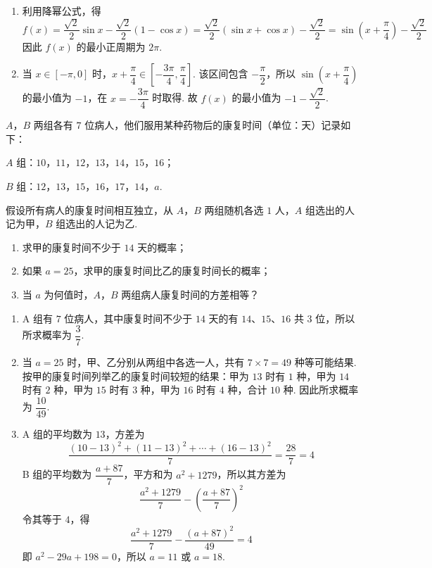 \begin{solution}
\begin{enumerate}
\item 利用降幂公式，得
\[
f(x)=\frac{\sqrt2}{2}\sin x-\frac{\sqrt2}{2}\left(1-\cos x\right)
=\frac{\sqrt2}{2}\left(\sin x+\cos x\right)-\frac{\sqrt2}{2}
=\sin\left(x+\frac{\pi}{4}\right)-\frac{\sqrt2}{2}
\]
因此 \(f(x)\) 的最小正周期为 \(2\pi\).
\item 当 \(x\in[-\pi,0]\) 时，\(x+\dfrac{\pi}{4}\in\left[-\dfrac{3\pi}{4},\dfrac{\pi}{4}\right]\). 该区间包含 \(-\dfrac{\pi}{2}\)，所以 \(\sin\left(x+\dfrac{\pi}{4}\right)\) 的最小值为 \(-1\)，在 \(x=-\dfrac{3\pi}{4}\) 时取得. 故 \(f(x)\) 的最小值为 \(-1-\dfrac{\sqrt2}{2}\).
\end{enumerate}
\end{solution}

\begin{problem}
\(A\)，\(B\) 两组各有 \(7\) 位病人，他们服用某种药物后的康复时间（单位：天）记录如下：

\(A\) 组：\(10\)，\(11\)，\(12\)，\(13\)，\(14\)，\(15\)，\(16\)；

\(B\) 组：\(12\)，\(13\)，\(15\)，\(16\)，\(17\)，\(14\)，\(a\).

假设所有病人的康复时间相互独立，从 \(A\)，\(B\) 两组随机各选 \(1\) 人，\(A\) 组选出的人记为甲，\(B\) 组选出的人记为乙.

\begin{enumerate}
\item 求甲的康复时间不少于 \(14\) 天的概率；
\item 如果 \(a=25\)，求甲的康复时间比乙的康复时间长的概率；
\item 当 \(a\) 为何值时，\(A\)，\(B\) 两组病人康复时间的方差相等？
\end{enumerate}
\end{problem}

\begin{solution}
\begin{enumerate}
\item A 组有 \(7\) 位病人，其中康复时间不少于 \(14\) 天的有 \(14\)、\(15\)、\(16\) 共 \(3\) 位，所以所求概率为 \(\dfrac{3}{7}\).
\item 当 \(a=25\) 时，甲、乙分别从两组中各选一人，共有 \(7\times7=49\) 种等可能结果. 按甲的康复时间列举乙的康复时间较短的结果：甲为 \(13\) 时有 \(1\) 种，甲为 \(14\) 时有 \(2\) 种，甲为 \(15\) 时有 \(3\) 种，甲为 \(16\) 时有 \(4\) 种，合计 \(10\) 种. 因此所求概率为 \(\dfrac{10}{49}\).
\item A 组的平均数为 \(13\)，方差为
\[
\frac{(10-13)^2+(11-13)^2+\cdots+(16-13)^2}{7}=\frac{28}{7}=4
\]
B 组的平均数为 \(\dfrac{a+87}{7}\)，平方和为 \(a^2+1279\)，所以其方差为
\[
\frac{a^2+1279}{7}-\left(\frac{a+87}{7}\right)^2
\]
令其等于 \(4\)，得
\[
\frac{a^2+1279}{7}-\frac{(a+87)^2}{49}=4
\]
即 \(a^2-29a+198=0\)，所以 \(a=11\) 或 \(a=18\).
\end{enumerate}
\end{solution}

